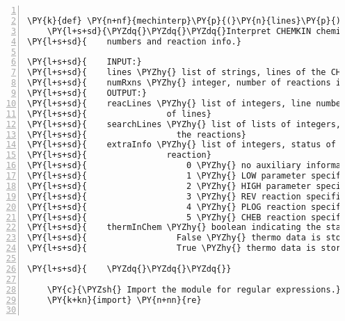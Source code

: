 \begin{Verbatim}[commandchars=\\\{\},fontsize=\small,numbers=left,firstnumber=1,stepnumber=2,firstline=2]

\PY{k}{def} \PY{n+nf}{mechinterp}\PY{p}{(}\PY{n}{lines}\PY{p}{)}\PY{p}{:}
    \PY{l+s+sd}{\PYZdq{}\PYZdq{}\PYZdq{}Interpret CHEMKIN chemistry input files and return lists of line}
\PY{l+s+sd}{    numbers and reaction info.}

\PY{l+s+sd}{    INPUT:}
\PY{l+s+sd}{    lines \PYZhy{} list of strings, lines of the CHEMKIN format chemistry input file}
\PY{l+s+sd}{    numRxns \PYZhy{} integer, number of reactions in the input mechanims}
\PY{l+s+sd}{    OUTPUT:}
\PY{l+s+sd}{    reacLines \PYZhy{} list of integers, line numbers of reactions in the input set}
\PY{l+s+sd}{                of lines}
\PY{l+s+sd}{    searchLines \PYZhy{} list of lists of integers, line numbers of the lines between}
\PY{l+s+sd}{                  the reactions}
\PY{l+s+sd}{    extraInfo \PYZhy{} list of integers, status of auxiliary information for a}
\PY{l+s+sd}{                reaction}
\PY{l+s+sd}{                    0 \PYZhy{} no auxiliary information}
\PY{l+s+sd}{                    1 \PYZhy{} LOW parameter specified}
\PY{l+s+sd}{                    2 \PYZhy{} HIGH parameter specified}
\PY{l+s+sd}{                    3 \PYZhy{} REV reaction specified}
\PY{l+s+sd}{                    4 \PYZhy{} PLOG reaction specified}
\PY{l+s+sd}{                    5 \PYZhy{} CHEB reaction specified}
\PY{l+s+sd}{    thermInChem \PYZhy{} boolean indicating the status of the thermodynamic data.}
\PY{l+s+sd}{                  False \PYZhy{} thermo data is stored in a separate file}
\PY{l+s+sd}{                  True \PYZhy{} thermo data is stored in the chemistry file}

\PY{l+s+sd}{    \PYZdq{}\PYZdq{}\PYZdq{}}

    \PY{c}{\PYZsh{} Import the module for regular expressions.}
    \PY{k+kn}{import} \PY{n+nn}{re}


\end{Verbatim}
